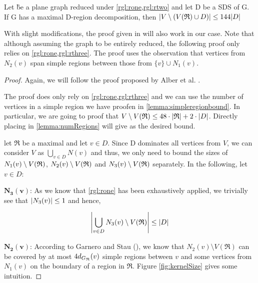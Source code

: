 \begin{proposition}\label{lemma:outside}
    Let \G be a plane graph reduced under \cref*{rgl:rone,rgl:rtwo} and let D be a SDS of G. If G has a maximal D-region decomposition, then $\abs{V \setminus (V(\mathfrak{R}) \cup D)} \leq 144 \abs{D}$
\end{proposition}

With slight modifications, the proof given in \cite{Garnero2014} will also work in our case. Note that although assuming the graph to be entirely reduced, the following proof only relies on \cref*{rgl:rone,rgl:rthree}. The proof uses the observation that vertices from $N_2(v)$ span simple regions between those from $\{v\} \cup N_1(v)$.

\begin{proof}
    Again, we will follow the proof proposed by Alber et al. \cite[Proposition 2]{Alber2004}. 
    
    The proof does only rely on \cref{rgl:rone,rgl:rthree} and we can use the number of vertices in a simple region we have proofen in \cref{lemma:simpleregionbound}. In particular, we are going to proof that $V \setminus V(\mathfrak{R}) \leq 48 \cdot \abs{\mathfrak{R}} + 2 \cdot \abs{D}$. Directly placing in \cref{lemma:numRegions} will give as the desired bound.
    
    let $\mathfrak{R}$ be a maximal \dreg and let $v \in D$. Since D dominates all vertices from $V$, we can consider $V$ as $\bigcup_{v \in D}N(v)$ and thus, we only need to bound the sizes of $N_1(v)\setminus {V(\mathfrak{R})} $, $N_2(v) \setminus {V(\mathfrak{R})} $ and $N_3(v) \setminus {V(\mathfrak{R})} $ separately. In the following, let $v \in D$:
    
    \noindent$\mathbf{N_3(v)}$: As we know that \cref{rgl:rone} has been exhaustively applied, we trivially see that $\abs{N_3(v)} \leq 1$ and hence, 
    
    \[\abs{\bigcup_{v \in D}N_3(v) \setminus V(\mathfrak{R})} \leq \abs{D}\]
    
    \noindent$\mathbf{N_2(v)}$: According to Garnero and Stau (\cite[Proposition 2]{Garnero2018}), we know that $N_2(v) \setminus V(\mathfrak{R})$ can be covered by at most $4 d_{G_{\mathfrak{R}}}(v)$ simple regions between $v$ and some vertices from $N_1(v)$ on the boundary of a region in $\mathfrak{R}$. Figure \ref{fig:kernelSize} gives some intuition.
    

\end{proof}
